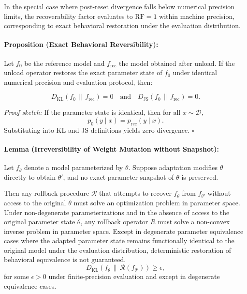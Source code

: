\documentclass[10pt]{article}
\begin{document}
	In the special case where post-reset divergence falls below numerical precision limits, the recoverability factor evaluates to $\mathrm{RF} = 1$ within machine precision, corresponding to exact behavioral restoration under the evaluation distribution.
	
	\paragraph{Proposition (Exact Behavioral Reversibility):}
	
	Let $f_0$ be the reference model and $f_{\mathrm{rec}}$ the model obtained after unload.  
	If the unload operator restores the exact parameter state of $f_0$ under identical numerical precision and evaluation protocol, then:
	
	\[
	D_{\mathrm{KL}}(f_0 \,\|\, f_{\mathrm{rec}}) = 0
	\quad \text{and} \quad
	D_{\mathrm{JS}}(f_0 \,\|\, f_{\mathrm{rec}}) = 0.
	\]
	
	\textit{Proof sketch:}
	If the parameter state is identical, then for all $x \sim \mathcal{D}$,
	\[
	p_0(y \mid x) = p_{\mathrm{rec}}(y \mid x).
	\]
	Substituting into KL and JS definitions yields zero divergence.
	\hfill $\square$
	
	\paragraph{Lemma (Irreversibility of Weight Mutation without Snapshot):}
	
	Let $f_\theta$ denote a model parameterized by $\theta$.
Suppose adaptation modifies $\theta$ directly to obtain $\theta'$, 
and no exact parameter snapshot of $\theta$ is preserved.

Then any rollback procedure $\mathcal{R}$ that attempts to recover $f_\theta$
from $f_{\theta'}$ without access to the original $\theta$
must solve an optimization problem in parameter space. Under non-degenerate parameterizations and in the absence of access to the original parameter state $\theta$, any rollback operator $R$ must solve a non-convex inverse problem in parameter space. Except in degenerate parameter equivalence cases where the adapted parameter state remains functionally identical to the original model under the evaluation distribution, deterministic restoration of behavioral equivalence is not guaranteed.
\[
D_{\mathrm{KL}}\!\left(f_\theta \,\middle\|\, \mathcal{R}(f_{\theta'})\right)
\ge \epsilon,
\]
for some $\epsilon > 0$ under finite-precision evaluation and except in degenerate equivalence cases.
\end{document}
